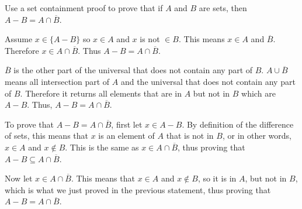 \begin{eval}
Use a set containment proof to prove that if $A$ and $B$ are sets, then $A-B = A\cap\overline{B}$.
\begin{spfenum}
\item
Assume $x\in \{A-B\}$ so $x\in A$ and $x$ is not $\in B$.  This means $x\in A$ and $\overline{B}$.
Therefore $x\in A\cap \overline{B}$.  Thus $A-B=A\cap\overline{B}$.

\noindent
\evallinethree
\item
$\overline{B}$ is the other part of the universal that does not contain any part of $B$.
$A\cup\overline{B}$ means all intersection part of $A$ and the universal that does not contain any part of $B$.
Therefore it returns all elements that are in $A$ but not in $B$ which are $A-B$.  Thus, $A-B=A\cap\overline{B}$.

\noindent
\evallinethree
\item
To prove that $A-B=A\cap\overline{B}$, first let $x\in A-B$.  By definition of the difference of sets, this means
that $x$ is an element of $A$ that is not in $B$, or in other words, $x\in A$ and $x\not\in B$.
This is the same as $x\in A\cap\overline{B}$, thus proving that $A-B\subseteq A\cap\overline{B}$.

Now let $x\in A\cap\overline{B}$.  This means that $x\in A$ and $x\not\in B$, so it is in $A$, but 
not in $B$, which is what we just proved in the previous statement, thus proving that $A-B = A\cap\overline{B}$.


\end{spfenum}
\end{eval}
